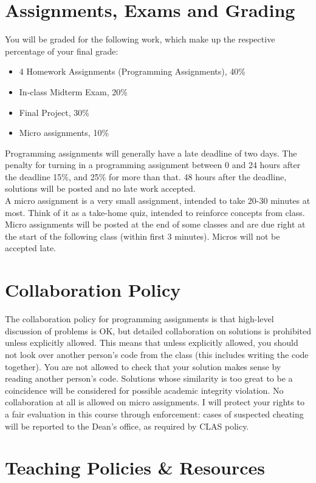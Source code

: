 \documentclass[10pt]{article}
\begin{document}
\section*{Assignments, Exams and Grading}

You will be graded for the following work, which make up the respective percentage of your final grade:
\begin{itemize}\itemsep-1pt
  \item 4 Homework Assignments (Programming Assignments), 40\%
  \item In-class Midterm Exam, 20\%
  \item Final Project, 30\%
  \item Micro assignments, 10\%
\end{itemize}
Programming assignments will generally have a late deadline of two days. The
penalty for turning in a programming assignment between 0 and 24 hours after
the deadline 15\%, and 25\% for more than that. 48 hours after the deadline,
solutions will be posted and no late work accepted.\\
A micro assignment is a very small assignment, intended to take 20-30 minutes
at most. Think of it as a take-home quiz, intended to reinforce concepts from
class. Micro assignments will be posted at the end of some classes and are due
right at the start of the following class (within first 3 minutes). Micros will
not be accepted late.


\section*{Collaboration Policy}

The collaboration policy for programming assignments is that high-level
discussion of problems is OK, but detailed collaboration on solutions is
prohibited unless explicitly allowed. This means that unless explicitly
allowed, you should not look over another person's code from the class (this
includes writing the code together). You are not allowed to check that your
solution makes sense by reading another person's code. Solutions whose
similarity is too great to be a coincidence will be considered for possible
academic integrity violation. No collaboration at all is allowed on micro
assignments. I will protect your rights to a fair evaluation in this course
through enforcement: cases of suspected cheating will be reported to the Dean's
office, as required by CLAS policy.


\section*{Teaching Policies \& Resources}
\end{document}
